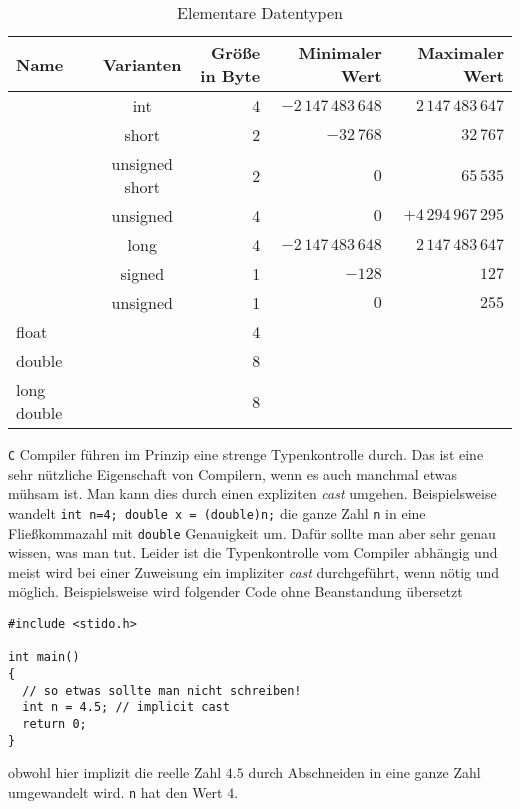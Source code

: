 \begin{table}[t]
\caption{Elementare Datentypen\label{tabelle1}}  %
\centering
\begin{tabular}{|l c c rrr|}
\hline
Name & & Varianten & Größe in Byte & Minimaler Wert & Maximaler Wert
\\[0.5ex]   
\hline %
		       & & int &4 & $-2\,147\,483\,648$ & $2\,147\,483\,647$ \\[-0.0ex]
		       & & short & 2 & $-32\,768$ & $32\,767$ \\[-0.0ex]
\raisebox{1ex}{int}  & & unsigned short& 2 & $0$ & $65\,535$ \\[-0.0ex]
		       & &unsigned& 4 & $0$ & $ +4\,294\,967\,295$ \\[1ex]
		       & &long& 4 &  $-2\,147\,483\,648$ & $2\,147\,483\,647$ \\
\hline
                            & &signed & 1 & $-128$ & $127$ \\[-1ex]
\raisebox{1.5ex}{char} &    & unsigned &1 & $0$ & $255$  \\[1ex]
\hline
float & & & 4 &  &  \\
double& & & 8 &  &  \\
long double& & &8 &  &  \\[1ex]

\hline                          %
\end{tabular}
\label{tab:PPer}
\end{table}

\texttt{C} Compiler führen im Prinzip eine strenge Typenkontrolle durch.
Das ist eine sehr nützliche Eigenschaft von Compilern, wenn es auch manchmal etwas mühsam ist. 
Man kann dies durch einen expliziten \emph{cast} umgehen.
Beispielsweise wandelt \texttt{int n=4; double x = (double)n;} die ganze Zahl \texttt{n} in eine Fließkommazahl mit \texttt{double} Genauigkeit um.
Dafür sollte man aber sehr genau wissen, was man tut.
Leider ist die Typenkontrolle vom Compiler abhängig und meist wird bei einer Zuweisung ein impliziter \emph{cast} durchgeführt, wenn nötig und möglich.
Beispielsweise wird folgender Code ohne Beanstandung übersetzt
\begin{lstlisting}[caption={Ungenaue Variablenzuweisung, implizit cast}, belowcaptionskip=0.3em]
#include <stido.h>

int main()
{
  // so etwas sollte man nicht schreiben!
  int n = 4.5; // implicit cast
  return 0;
}
\end{lstlisting}
obwohl hier implizit die reelle Zahl $4.5$ durch Abschneiden in eine ganze Zahl umgewandelt wird.
\texttt{n} hat den Wert $4$.

